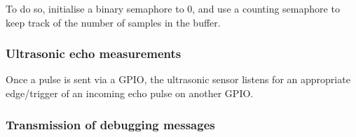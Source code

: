To do so, initialise a binary semaphore to 0, and use a counting semaphore to keep track of the number of samples in the buffer.

\subsubsection*{Ultrasonic echo measurements}

Once a pulse is sent via a GPIO, the ultrasonic sensor listens for an appropriate edge/trigger of an incoming echo pulse on another GPIO.

\subsubsection*{Transmission of debugging messages}
